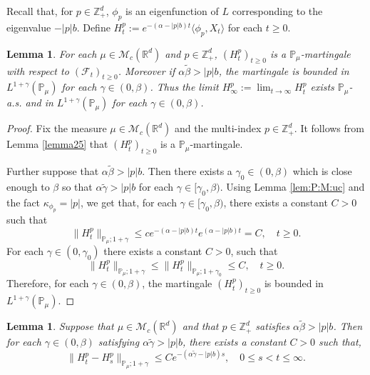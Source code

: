 \documentclass[12pt,a4paper]{amsart}
\theoremstyle{plain}
\newtheorem{lem}[thm]{Lemma}
\theoremstyle{definition}
\numberwithin{equation}{section}
\begin{document}
Recall that, for $p\in \mathbb Z_+^d$,  $\phi_p$ is an eigenfunction of $L$ corresponding to the eigenvalue $-|p|b$. Define
\(
  H_t^p
  :=e^{-(\alpha-|p|b)t}\langle\phi_p,X_t\rangle
\)
for each $t\geq 0$.

\begin{lem}
  \label{lem:M:L:ML}
   For each $\mu\in \mathcal M_c(\mathbb R^d)$ and $p \in \mathbb Z_+^d$, $(H^p_t)_{t\geq 0}$ is a $\mathbb P_{\mu}$-martingale with respect to
    $(\mathscr F_t)_{t\geq 0}$.
    Moreover if $\alpha\tilde \beta>|p|b$, the martingale is bounded in $L^{1+\gamma}(\mathbb P_\mu)$ for each $\gamma\in (0, \beta)$.
  Thus the limit $ H_{\infty}^p := \lim_{t\rightarrow \infty}H_t^p $  exists $\mathbb{P}_{\mu}$-a.s.
   and in $L^{1+\gamma}(\mathbb{P}_{\mu})$ for each $\gamma \in (0,\beta)$.
\end{lem}
\begin{proof}
  Fix the measure $\mu \in \mathcal M_c(\mathbb R^d)$ and the multi-index $p \in \mathbb Z_+^d$.
  It follows from Lemma \ref{lemma25} that $(H_t^p)_{t\geq 0}$ is a $\mathbb P_\mu$-martingale.

  Further suppose that $\alpha \tilde \beta > |p| b$.
  Then there exists a $\gamma_0 \in (0,\beta)$ which is close enough to $\beta$ so that $\alpha\tilde \gamma>|p|b$ for each $\gamma\in [\gamma_0, \beta)$.
  Using  Lemma \ref{lem:P:M:uc} and the fact $\kappa_{\phi_p}=|p|$, we get that, for each $\gamma\in [\gamma_0, \beta)$,
  there exists a constant $C>0$ such that
\[
 	\|H_t^p\|_{\mathbb P_\mu;1+\gamma}
  \leq c e^{-(\alpha-|p|b)t}e^{(\alpha-|p|b)t}
    = C
  , \quad t\geq 0.
\]
For each $\gamma\in (0, \gamma_0)$ there exists a constant $C>0$, such that
\[
	\| H_t^p \|_{\mathbb P_\mu;1+\gamma}
	\leq \| H_t^p \|_{\mathbb P_\mu;1+\gamma_0}
    \leq C,
	\quad t\geq 0.
\]
Therefore, for each $\gamma \in (0,\beta)$, the martingale $(H_t^p)_{t\geq 0}$ is bounded in $L^{1+\gamma}(\mathbb{P}_{\mu})$.
\end{proof}
\begin{lem}
  \label{lem: control of wt}
  Suppose that $\mu\in \mathcal M_c(\mathbb R^d)$ and that $p \in \mathbb Z_+^d$ satisfies $\alpha \tilde \beta > |p|b$.
  Then for each $\gamma \in (0,\beta)$ satisfying $\alpha \tilde \gamma > |p|b$, there exists a constant $C> 0$ such that,
\[
  \|H^p_t-H^p_s\|_{\mathbb{P}_{\mu};1+\gamma}
  \leq C e^{-(\alpha \tilde \gamma-|p|b)s},
  \quad 0 \leq s < t \leq \infty.
\]
\end{lem}
\end{document}
